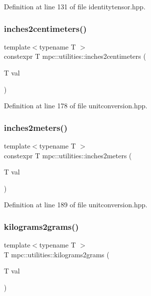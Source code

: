 Definition at line 131 of file identitytensor.\+hpp.

\mbox{\label{namespacempc_1_1utilities_a210071ae7c4eeea2c7269246fe901ac8}} 
\subsubsection{\texorpdfstring{inches2centimeters()}{inches2centimeters()}}
{\footnotesize\ttfamily template$<$typename T $>$ \\
constexpr T mpc\+::utilities\+::inches2centimeters (\begin{DoxyParamCaption}\item[{T}]{val }\end{DoxyParamCaption})}



Definition at line 178 of file unitconversion.\+hpp.

\mbox{\label{namespacempc_1_1utilities_a267f12c10d16584dbf3cb0b0ddba8bc3}} 
\subsubsection{\texorpdfstring{inches2meters()}{inches2meters()}}
{\footnotesize\ttfamily template$<$typename T $>$ \\
constexpr T mpc\+::utilities\+::inches2meters (\begin{DoxyParamCaption}\item[{T}]{val }\end{DoxyParamCaption})}



Definition at line 189 of file unitconversion.\+hpp.

\mbox{\label{namespacempc_1_1utilities_ae04157378455df2cf7b5c7e1df0f0b73}} 
\subsubsection{\texorpdfstring{kilograms2grams()}{kilograms2grams()}}
{\footnotesize\ttfamily template$<$typename T $>$ \\
T mpc\+::utilities\+::kilograms2grams (\begin{DoxyParamCaption}\item[{T}]{val }\end{DoxyParamCaption})}



